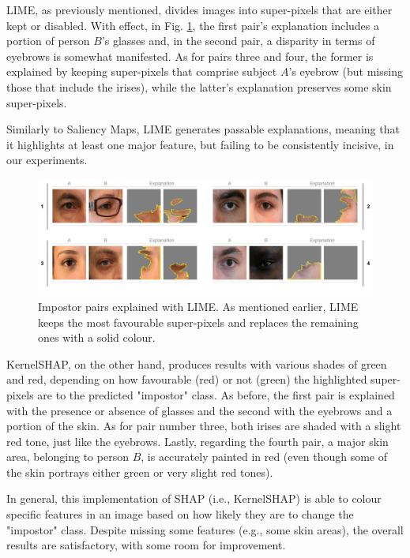 \ac{LIME}, as previously mentioned, divides images into super-pixels that are either kept or disabled. With effect, in Fig. \ref{fig:impostor_pairs_lime}, the first pair's explanation includes a portion of person $B$'s glasses and, in the second pair, a disparity in terms of eyebrows is somewhat manifested. As for pairs three and four, the former is explained by keeping super-pixels that comprise subject $A$'s eyebrow (but missing those that include the irises), while the latter's explanation preserves some skin super-pixels. 

Similarly to Saliency Maps, \ac{LIME} generates passable explanations, meaning that it highlights at least one major feature, but failing to be consistently incisive, in our experiments.

\begin{figure}[h]
\centering
\includegraphics[width=\textwidth]{figures/figure_34.pdf}
\caption{Impostor pairs explained with \ac{LIME}. As mentioned earlier, \ac{LIME} keeps the most favourable super-pixels and replaces the remaining ones with a solid colour.}
\label{fig:impostor_pairs_lime}
\end{figure}

Kernel\ac{SHAP}, on the other hand, produces results with various shades of green and red, depending on how favourable (red) or not (green) the highlighted super-pixels are to the predicted "impostor" class. As before, the first pair is explained with the presence or absence of glasses and the second with the eyebrows and a portion of the skin. As for pair number three, both irises are shaded with a slight red tone, just like the eyebrows. Lastly, regarding the fourth pair, a major skin area, belonging to person $B$, is accurately painted in red (even though some of the skin portrays either green or very slight red tones).

In general, this implementation of \ac{SHAP} (i.e., Kernel\ac{SHAP}) is able to colour specific features in an image based on how likely they are to change the "impostor" class. Despite missing some features (e.g., some skin areas), the overall results are satisfactory, with some room for improvement.

